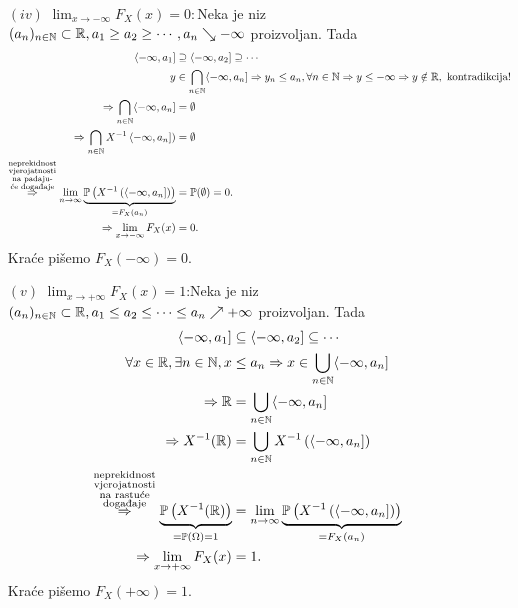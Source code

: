 \documentclass{article}
\begin{document}
\begin{itemize}
    \item[\((iv)\)] \(\displaystyle\lim_{x\to-\infty}F_X(x)=0:\)\newline Neka je niz \((a_n)_{n\in\Bbb N}\subset\Bbb R, a_1\ge a_2\ge\cdots,a_n\searrow-\infty\) proizvoljan. Tada \[\begin{aligned}\langle-\infty,a_1]&\supseteq\langle-\infty,a_2]\supseteq\cdots\\y&\in\bigcap_{n\in\Bbb N}\langle-\infty,a_n]\Rightarrow y_n\le a_n,\forall n\in\Bbb N\Rightarrow y\le-\infty\Rightarrow y\notin\Bbb R,\text{ kontradikcija!}\\\Rightarrow\bigcap_{n\in\Bbb N}\langle-\infty,a_n]&=\emptyset\\\Rightarrow\bigcap_{n\in\Bbb N}X^{-1}\left\langle-\infty,a_n]\right)&=\emptyset\\\overset{\substack{\text{neprekidnost}\\\text{vjerojatnosti}\\\text{na padaju-}\\\text{će doga\dj{}aje}}}{\Rightarrow}\lim_{n\to\infty}\underbrace{\Bbb P\left(X^{-1}\left(\langle-\infty,a_n]\right)\right)}_{=F_X(a_n)}&=\Bbb P(\emptyset)=0.\\\Rightarrow\lim_{x\to-\infty}F_X(x)&=0.\end{aligned}\] Kraće pišemo \(F_X(-\infty)=0.\)
    \item[\((v)\)] \(\displaystyle\lim_{x\to+\infty}F_X(x)=1\):\newline Neka je niz \((a_n)_{n\in\Bbb N}\subset\Bbb R,a_1\le a_2\le\cdots\le a_n\nearrow+\infty\) proizvoljan. Tada \[\begin{aligned}\langle-\infty,a_1]&\subseteq\langle-\infty,a_2]\subseteq\cdots\\\forall x\in\Bbb R,\exists n\in\Bbb N, x&\le a_n\Rightarrow x\in\bigcup_{n\in\Bbb N}\langle-\infty,a_n]\\\Rightarrow\Bbb R&=\bigcup_{n\in\Bbb N}\langle-\infty,a_n]\\\Rightarrow X^{-1}(\Bbb R)&=\bigcup_{n\in\Bbb N}X^{-1}\left(\langle-\infty,a_n]\right)\\\overset{\substack{\text{neprekidnost}\\\text{vjerojatnosti}\\\text{na rastuće}\\\text{doga\dj{}aje}}}{\Rightarrow}\underbrace{\Bbb P\left(X^{-1}(\Bbb R)\right)}_{=\Bbb P(\Omega)=1}&=\lim_{n\to\infty}\underbrace{\Bbb P\left(X^{-1}\left(\langle-\infty,a_n]\right)\right)}_{=F_X(a_n)}\\\Rightarrow\lim_{x\to+\infty}F_X(x)&=1.\end{aligned}\] Kraće pišemo \(F_X(+\infty)=1.\)

\end{itemize}
\end{document}
